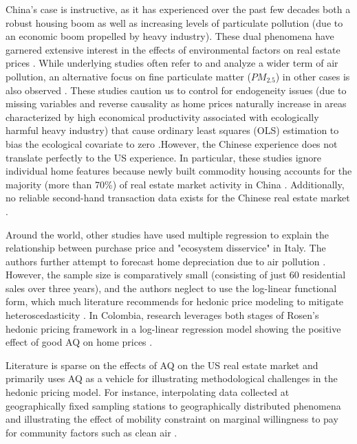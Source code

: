 \documentclass[sigconf,nonacm,11pt]{acmart}
\begin{document}
China's case is instructive, as it has experienced over the past few decades both a robust housing boom as well as increasing levels of particulate pollution (due to an economic boom propelled by heavy industry). These dual phenomena have garnered extensive interest in the effects of environmental factors on real estate prices \cite{Zheng2014} \cite{Mei2020}. While underlying studies often refer to and analyze a wider term of air pollution, an alternative focus on fine particulate matter ($PM_{2.5 }$) in other cases is also observed \cite{Chen2017} \cite{Chen2019} \cite{Wang2021} \cite{Sun2020} \cite{Dai2020}. These studies caution us to control for endogeneity issues (due to missing variables and reverse causality as home prices naturally increase in areas characterized by high economical productivity associated with ecologically harmful heavy industry) that cause ordinary least squares (OLS) estimation to bias the ecological covariate to zero \cite{Zheng2014} \cite{Chen2017} \cite{Chen2019}.\newline However, the Chinese experience does not translate perfectly to the US experience. In particular, these studies ignore individual home features because newly built commodity housing accounts for the majority (more than 70\%) of real estate market activity in China \cite{Chen2017}. Additionally, no reliable second-hand transaction data exists for the Chinese real estate market \cite{Zheng2014}.

Around the world, other studies have used multiple regression to explain the relationship between purchase price and "ecosystem disservice" in Italy. The authors further attempt to forecast home depreciation due to air pollution \cite{Nestico2020}. However, the sample size is comparatively small (consisting of just 60 residential sales over three years), and the authors neglect to use the log-linear functional form, which much literature recommends for hedonic price modeling to mitigate heteroscedasticity \cite{Morano2019} \cite{Fletcher2000} \cite{Cassel1985}. In Colombia, research leverages both stages of Rosen's hedonic pricing framework %
\cite{Rosen1974} in a log-linear regression model showing the positive effect of good AQ on home prices \cite{Carriazo2018}.

Literature is sparse on the effects of AQ on the US real estate market and primarily uses AQ as a vehicle for illustrating methodological challenges in the hedonic pricing model. For instance, interpolating data collected at geographically fixed sampling stations to geographically distributed phenomena \cite{Anselin2006} and illustrating the effect of mobility constraint on marginal willingness to pay for community factors such as clean air \cite{Bayer2009}.
\end{document}
